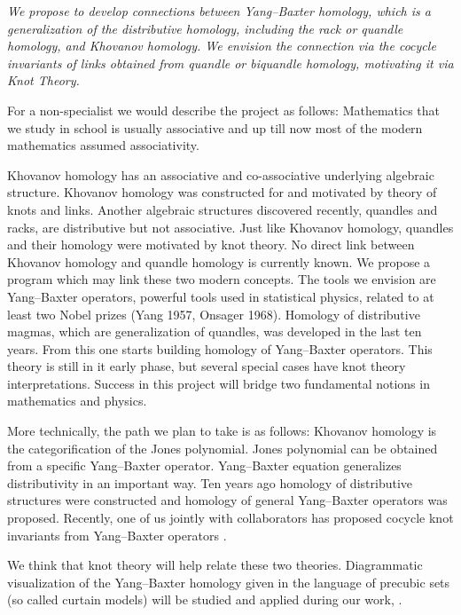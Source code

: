 \documentclass[12pt]{amsart}
\begin{document}
{\it We propose to develop connections between Yang–Baxter homology, which is a generalization of the distributive homology, including the rack or quandle homology, and Khovanov homology. We envision the connection via the
cocycle invariants of links obtained from quandle or biquandle homology,
motivating it via Knot Theory.

For a non-specialist we would describe the project as follows: Mathematics that we study in school is usually associative and up till now most of the modern mathematics assumed associativity.

Khovanov homology has an associative and co-associative underlying algebraic structure. Khovanov homology was constructed for and motivated
by theory of knots and links.
Another algebraic structures discovered recently, quandles and racks, are
distributive but not associative. Just like Khovanov homology, quandles
and their homology were motivated by knot theory. No direct link between
Khovanov homology and quandle homology is currently known.
We propose a program which may link these two modern concepts. The
tools we envision are Yang–Baxter operators, powerful tools used in statistical physics, related to at least two Nobel prizes (Yang 1957, Onsager 1968). Homology of distributive magmas, which are generalization of quandles, was developed in the last ten years. From this one starts building homology of Yang–Baxter operators. This theory is still in it early phase, but several special cases have knot theory interpretations. Success in this project will bridge two fundamental notions in mathematics and physics.

More technically, the path we plan to take is as follows: Khovanov homology is the categorification of the Jones polynomial. Jones polynomial can be obtained from a specific Yang–Baxter operator.
Yang–Baxter equation generalizes distributivity in an important way. Ten
years ago homology of distributive structures were constructed and homology
of general Yang–Baxter operators was proposed. Recently, one of us jointly
with collaborators has proposed cocycle knot invariants from Yang–Baxter
operators \cite{PVY}.

We think that knot theory will help relate these two theories. 
Diagrammatic visualization of the Yang–Baxter homology given in the language of
precubic sets (so called curtain models) will be studied and applied during our work, \cite{Prz12}.}
\end{document}
